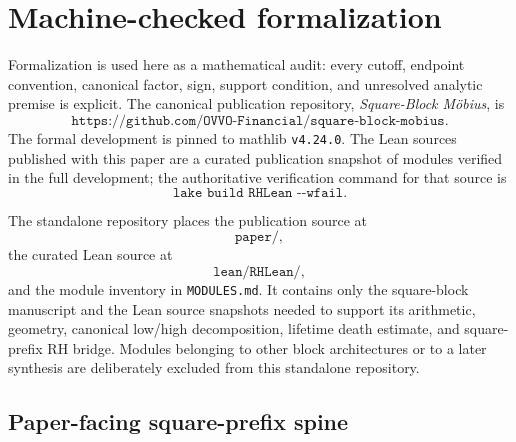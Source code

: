 \section{Machine-checked formalization}
\label{sec:lean}

Formalization is used here as a mathematical audit: every cutoff, endpoint convention, canonical factor, sign, support condition, and unresolved analytic premise is explicit.  The canonical publication repository, \emph{Square-Block M\"obius}, is
\[
 \texttt{https://github.com/OVVO-Financial/square-block-mobius}.
\]
The formal development is pinned to mathlib \texttt{v4.24.0}.  The Lean sources published with this paper are a curated publication snapshot of modules verified in the full development; the authoritative verification command for that source is
\[
 \texttt{lake build RHLean -{}-wfail}.
\]

The standalone repository places the publication source at
\[
 \texttt{paper/},
\]
the curated Lean source at
\[
 \texttt{lean/RHLean/},
\]
and the module inventory in \texttt{MODULES.md}.  It contains only the square-block manuscript and the Lean source snapshots needed to support its arithmetic, geometry, canonical low/high decomposition, lifetime death estimate, and square-prefix RH bridge.  Modules belonging to other block architectures or to a later synthesis are deliberately excluded from this standalone repository.

\subsection{Paper-facing square-prefix spine}

